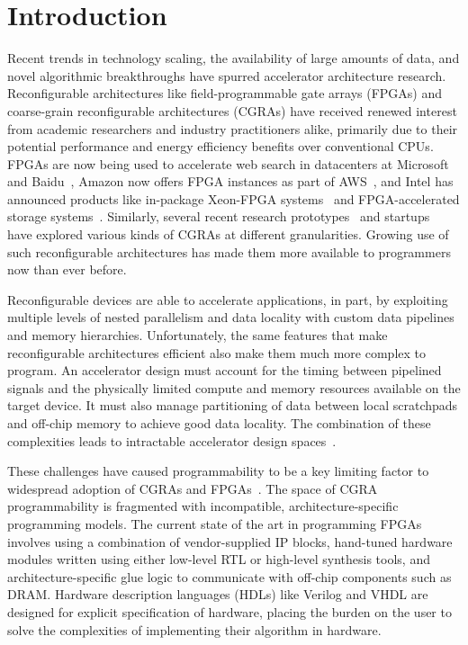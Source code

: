 \chapter{Introduction}
\label{intro}

Recent trends in technology scaling, the availability of large amounts of data, and novel algorithmic breakthroughs
have spurred accelerator architecture research. Reconfigurable architectures like field-programmable gate arrays (FPGAs) and coarse-grain reconfigurable  architectures (CGRAs)
have received renewed interest from academic researchers and industry practitioners alike, primarily due to their potential performance and energy efficiency benefits over conventional CPUs. 
FPGAs are now being used to accelerate web search
in datacenters at Microsoft and Baidu~\cite{catapult, baidu},
Amazon now offers FPGA instances as part of AWS~\cite{awsf1}, 
and Intel has announced products like in-package Xeon-FPGA systems~\cite{harp}
and FPGA-accelerated storage systems~\cite{nand_flash}.
Similarly, several recent research prototypes~\cite{dyser, ti, scaledeep, scnn, plasticine}
and startups~\cite{wavecomp, nervana} have explored various
kinds of CGRAs at different granularities. 
Growing use of such reconfigurable architectures has made them more available to programmers now than ever before.


Reconfigurable devices are able to accelerate applications, in part, by exploiting multiple levels of nested parallelism and data locality with custom data pipelines and memory hierarchies.
Unfortunately, the same features that make reconfigurable architectures efficient also make them much more complex to program. An accelerator design must account for the timing between pipelined signals and
the physically limited compute and memory resources available on the target device. It must also manage partitioning of data between local scratchpads and off-chip memory to achieve good data locality. 
The combination of these complexities leads to intractable accelerator design spaces~\cite{cascaval}.


These challenges have caused programmability to be a key limiting factor to widespread adoption of CGRAs and FPGAs~\cite{fpgaMasses,DeSutter2013}. 
The space of CGRA programmability is fragmented with incompatible, architecture-specific programming models.
The current state of the art in programming FPGAs involves using a combination of vendor-supplied IP blocks, hand-tuned hardware modules written using either low-level RTL or high-level synthesis tools, and architecture-specific glue logic to communicate with off-chip components such as DRAM. 
Hardware description languages (HDLs) like Verilog and VHDL are designed for explicit specification of hardware, 
placing the burden on the user to solve the complexities of implementing their algorithm in hardware.


